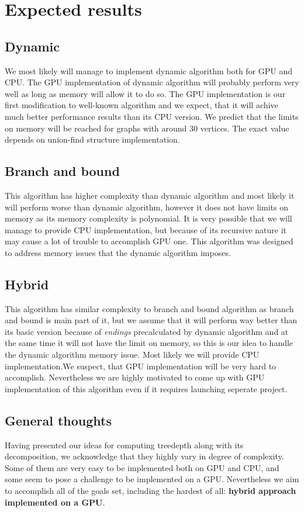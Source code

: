\section{Expected results}

\subsection{Dynamic}
We most likely will manage to implement dynamic algorithm both for GPU and CPU. The GPU implementation of dynamic algorithm will probably perform very well as long as memory will allow it to do so. The GPU implementation is our first modification to well-known algorithm and we expect, that it will achive much better performance results than its CPU version. We predict that the limits on memory will be reached for graphs with around 30 vertices. The exact value depends on union-find structure implementation.

\subsection{Branch and bound}
This algorithm has higher complexity than dynamic algorithm and most likely it will perform worse than dynamic algorithm, however it does not have limits on memory as its memory complexity is polynomial. It is very possible that we will manage to provide CPU implementation, but because of its recursive nature it may cause a lot of trouble to accomplish GPU one. This algorithm was designed to address memory issues that the dynamic algorithm imposes.

\subsection{Hybrid}
This algorithm has similar complexity to branch and bound algorithm as branch and bound is main part of it, but we assume that it will perform way better than its basic version because of \emph{endings} precalculated by dynamic algorithm and  at the same time it will not have the limit on memory, so this is our idea to handle the dynamic algorithm memory issue. Most likely we will provide CPU implementation.We suspect, that GPU implementation will be very hard to accomplish. Nevertheless we are highly motivated to come up with GPU implementation of this algorithm even if it requires launching seperate project.

\subsection{General thoughts}
Having presented our ideas for computing treedepth along with its decomposition, we acknowledge that they highly vary in degree of complexity. Some of them are very easy to be implemented both on GPU and CPU, and some seem to pose a challenge to be implemented on a GPU. Nevertheless we aim to accomplish all of the goals set, including the hardest of all: \textbf{hybrid approach implemented on a GPU}.

